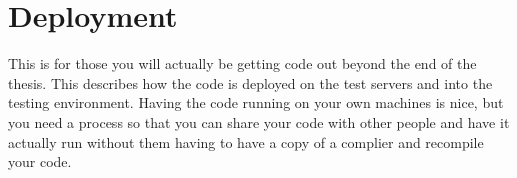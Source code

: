 \chapter{Deployment}
\label{chap:deployment}
This is for those you will actually be getting code out beyond the end of the thesis.  This describes how the code is deployed on the test servers and into the testing environment.  Having the code running on your own machines is nice, but you need a process so that you can share your code with other people and have it actually run without them having to have a copy of a complier and recompile your code.


